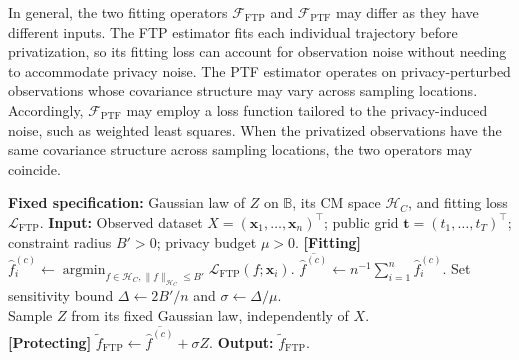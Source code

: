 \documentclass[twoside,11pt]{article}
\DeclareMathOperator*{\argmin}{argmin}
\begin{document}
In general, the two fitting operators $\mathcal{F}_{\mathrm{FTP}}$ and $\mathcal{F}_{\mathrm{PTF}}$ may differ as they have different inputs. The FTP estimator fits each individual trajectory before privatization, so its fitting loss can account for observation noise without needing to accommodate privacy noise. The PTF estimator operates on privacy-perturbed observations whose covariance structure may vary across sampling locations. Accordingly, $\mathcal{F}_{\mathrm{PTF}}$ may employ a loss function tailored to the privacy-induced noise, such as weighted least squares. When the privatized observations have the same covariance structure across sampling locations, the two operators may coincide.

\begin{algorithm}[t]
\caption{Fit-Then-Protect (FTP); $\mathtt{FTP}(X, \mathbf{t};B',\mu)$}
\label{alg: FTP}
\begin{algorithmic}[1]
\Statex \textbf{Fixed specification:} Gaussian law of $Z$ on $\mathbb B$, its CM space $\mathcal H_C$, and fitting loss $\mathcal L_{\mathrm{FTP}}$.
\State \textbf{Input:} Observed dataset $X=(\mathbf{x}_1,\ldots,\mathbf{x}_n)^\top$; public grid $\mathbf t=(t_1,\ldots,t_T)^\top$; constraint radius $B'>0$; privacy budget $\mu>0$.
\State \textbf{[Fitting]} $\hat{f}_i^{(c)} \gets 
\argmin_{f\in \mathcal{H}_C,\|f\|_{\mathcal{H}_C}\leq B'} 
\mathcal{L}_{\mathrm{FTP}}(f;\mathbf{x}_i)
$. 
\EndFor 
\State
$\overline{\hat {f}^{(c)}}\gets n^{-1}\sum_{i=1}^{n} \hat{f}_i^{(c)}$. 
\State 
Set sensitivity bound $\Delta\gets 2B'/n$ and $\sigma\gets\Delta/\mu$.\\
Sample $Z$ from its fixed Gaussian law, independently of $X$.\\
\textbf{[Protecting]}  
$\widetilde f_{\mathrm{FTP}} \gets
\overline{\hat {f}^{(c)}} + \sigma Z$. 
\State \textbf{Output:} $\widetilde f_{\mathrm{FTP}}$.
\end{algorithmic}
\end{algorithm}
\end{document}
